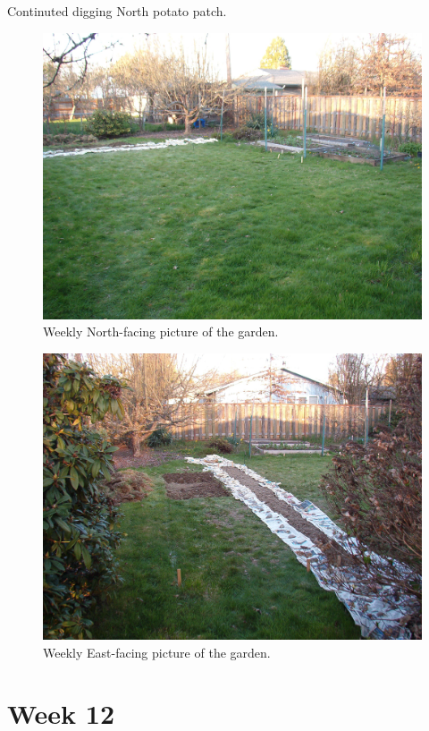 \documentclass{article}
\begin{document}
Continuted digging North potato patch.
\begin{figure}
\protect \includegraphics[scale=0.20]{pics/0322_garden1.jpg}
\caption{Weekly North-facing picture of the garden.}
\end{figure}
\begin{figure}
\protect \includegraphics[scale=0.20]{pics/0322_garden2.jpg}
\caption{Weekly East-facing picture of the garden.}
\end{figure}

\clearpage

\section*{Week 12}
\end{document}
